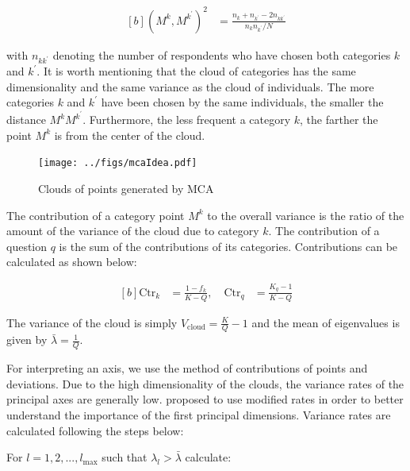 \documentclass[conference,final,]{IEEEtran}
\begin{document}
\begin{equation}
\begin{aligned}[b]
\label{eq:distCat}
(M^k, M^{k^{\prime}})^2 &= \frac{n_k + n_{k^\prime} - 2 n_{kk^\prime} }{n_k n_{k^\prime}/N}
\end{aligned}
\end{equation}

with \(n_{kk^\prime}\) denoting the number of respondents who have
chosen both categories \(k\) and \(k^\prime.\) It is worth mentioning
that the cloud of categories has the same dimensionality and the same
variance as the cloud of individuals. The more categories \(k\) and
\(k^\prime\) have been chosen by the same individuals, the smaller the
distance \(M^kM^{k^\prime}\). Furthermore, the less frequent a category
\(k\), the farther the point \(M^k\) is from the center of the cloud.

\begin{figure}[!t] 
\centering 
\texttt{[image: ../figs/mcaIdea.pdf]}
\caption{Clouds of points generated by MCA}
\label{fig_MCAillustration} 
\end{figure}

The contribution of a category point \(M^k\) to the overall variance is
the ratio of the amount of the variance of the cloud due to category
\(k\). The contribution of a question \(q\) is the sum of the
contributions of its categories. Contributions can be calculated as
shown below:

\begin{equation}
\begin{aligned}[b]
\label{eq:contribMk}
\text{Ctr}_k &= \frac{1-f_k}{K-Q}, \quad \text{Ctr}_q &= \frac{K_q -1 }{K-Q}
\end{aligned}
\end{equation}

The variance of the cloud is simply
\(V_{\text{cloud}} = \frac{K}{Q} - 1\) and the mean of eigenvalues is
given by \(\bar{\lambda} = \frac{1}{Q}.\)

For interpreting an axis, we use the method of contributions of points
and deviations. Due to the high dimensionality of the clouds, the
variance rates of the principal axes are generally low.
\cite{benzecri1992correspondence} proposed to use modified rates in
order to better understand the importance of the first principal
dimensions. Variance rates are calculated following the steps below:

For \(l = 1,2,...,l_{\max}\) such that \(\lambda_l > \bar{\lambda}\)
calculate:
\end{document}
